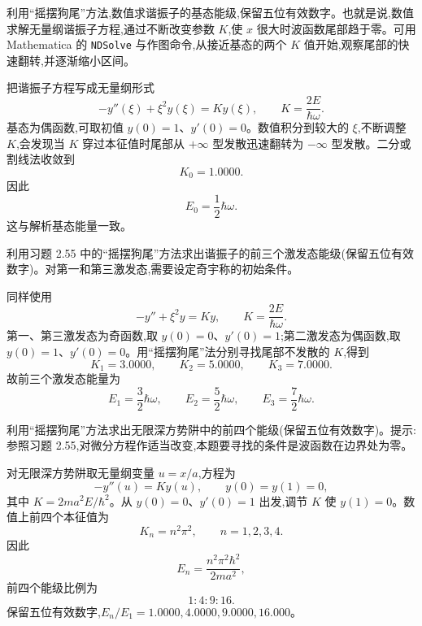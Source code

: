 \begin{question}
利用“摇摆狗尾”方法,数值求谐振子的基态能级,保留五位有效数字。也就是说,数值求解无量纲谐振子方程,通过不断改变参数 $K$,使 $x$ 很大时波函数尾部趋于零。可用 Mathematica 的 \texttt{NDSolve} 与作图命令,从接近基态的两个 $K$ 值开始,观察尾部的快速翻转,并逐渐缩小区间。
\begin{solution}
把谐振子方程写成无量纲形式
\[
-y''(\xi)+\xi^2y(\xi)=Ky(\xi),
\qquad K=\frac{2E}{\hbar\omega}.
\]
基态为偶函数,可取初值 $y(0)=1$、$y'(0)=0$。数值积分到较大的 $\xi$,不断调整 $K$,会发现当 $K$ 穿过本征值时尾部从 $+\infty$ 型发散迅速翻转为 $-\infty$ 型发散。二分或割线法收敛到
\[
K_0=1.0000.
\]
因此
\[
E_0=\frac12\hbar\omega.
\]
这与解析基态能量一致。
\end{solution}
\end{question}

\begin{question}
利用习题 2.55 中的“摇摆狗尾”方法求出谐振子的前三个激发态能级(保留五位有效数字)。对第一和第三激发态,需要设定奇宇称的初始条件。
\begin{solution}
同样使用
\[
-y''+\xi^2y=Ky,
\qquad K=\frac{2E}{\hbar\omega}.
\]
第一、第三激发态为奇函数,取 $y(0)=0$、$y'(0)=1$;第二激发态为偶函数,取 $y(0)=1$、$y'(0)=0$。用“摇摆狗尾”法分别寻找尾部不发散的 $K$,得到
\[
K_1=3.0000,
\qquad
K_2=5.0000,
\qquad
K_3=7.0000.
\]
故前三个激发态能量为
\[
E_1=\frac32\hbar\omega,
\qquad
E_2=\frac52\hbar\omega,
\qquad
E_3=\frac72\hbar\omega.
\]
\end{solution}
\end{question}

\begin{question}
利用“摇摆狗尾”方法求出无限深方势阱中的前四个能级(保留五位有效数字)。提示:参照习题 2.55,对微分方程作适当改变,本题要寻找的条件是波函数在边界处为零。
\begin{solution}
对无限深方势阱取无量纲变量 $u=x/a$,方程为
\[
-y''(u)=Ky(u),
\qquad y(0)=y(1)=0,
\]
其中 $K=2ma^2E/\hbar^2$。从 $y(0)=0$、$y'(0)=1$ 出发,调节 $K$ 使 $y(1)=0$。数值上前四个本征值为
\[
K_n=n^2\pi^2,
\qquad n=1,2,3,4.
\]
因此
\[
E_n=\frac{n^2\pi^2\hbar^2}{2ma^2},
\]
前四个能级比例为
\[
1:4:9:16.
\]
保留五位有效数字,$E_n/E_1=1.0000,4.0000,9.0000,16.000$。
\end{solution}
\end{question}

